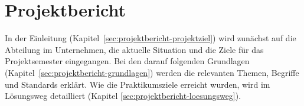 
\chapter{Projektbericht} \label{ch:projektbericht}

In der Einleitung (Kapitel\ \ref{sec:projektbericht-projektziel}) wird zunächst auf die Abteilung im Unternehmen, die aktuelle Situation und die Ziele für das Projektsemester eingegangen.
Bei den darauf folgenden Grundlagen (Kapitel\ \ref{sec:projektbericht-grundlagen}) werden die relevanten Themen, Begriffe und Standards erklärt.
Wie die Praktikumsziele erreicht wurden, wird im Lösungsweg detailliert (Kapitel \ref{sec:projektbericht-loesungsweg}).






